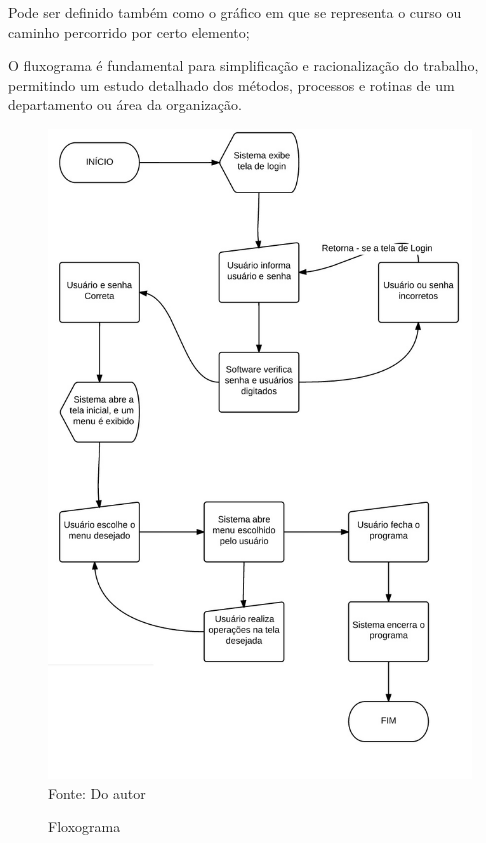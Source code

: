 Pode ser definido também como o gráfico em que se representa o curso ou caminho percorrido por certo elemento;

O fluxograma é fundamental para simplificação e racionalização do trabalho, permitindo um estudo detalhado dos métodos, processos e rotinas de um departamento ou área da organização. 


\begin{figure}[H]
	\centering 
	\caption{Floxograma}
	
	\label{loxograma}
	\includegraphics[scale = 0.70]{imagens/fluxo.jpg}
	\\Fonte: Do autor
\end{figure}


\newpage
